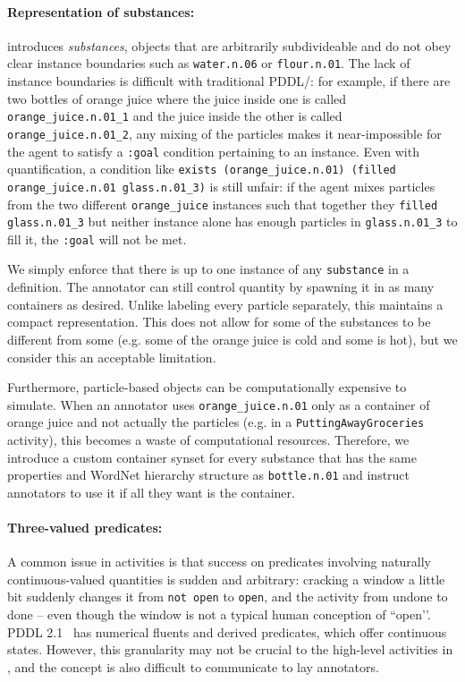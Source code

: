 \paragraph{Representation of substances:} \benchmark introduces \textit{substances}, objects that are arbitrarily subdivideable and do not obey clear instance boundaries such as \texttt{water.n.06} or \texttt{flour.n.01}. The lack of instance boundaries is difficult with traditional PDDL/\bddl: for example, if there are two bottles of orange juice where the juice inside one is called \texttt{orange\_juice.n.01\_1} and the juice inside the other is called \texttt{orange\_juice.n.01\_2}, any mixing of the particles makes it near-impossible for the agent to satisfy a \texttt{:goal} condition pertaining to an instance. Even with quantification, a condition like \texttt{exists (orange\_juice.n.01) (filled orange\_juice.n.01 glass.n.01\_3)} is still unfair: if the agent mixes particles from the two different \texttt{orange\_juice} instances such that together they \texttt{filled glass.n.01\_3} but neither instance alone has enough particles in \texttt{glass.n.01\_3} to fill it, the \texttt{:goal} will not be met.

We simply enforce that there is up to one instance of any \texttt{substance} in a definition. The annotator can still control quantity by spawning it in as many containers as desired. Unlike labeling every particle separately, this maintains a compact representation. This does not allow for some of the substances to be different from some (e.g. some of the orange juice is cold and some is hot), but we consider this an acceptable limitation.

Furthermore, particle-based objects can be computationally expensive to simulate. When an annotator uses \texttt{orange\_juice.n.01} only as a container of orange juice and not actually the particles (e.g. in a \texttt{PuttingAwayGroceries} activity), this becomes a waste of computational resources. Therefore, we introduce a custom container synset for every substance that has the same properties and WordNet hierarchy structure as \texttt{bottle.n.01} and instruct annotators to use it if all they want is the container.

\paragraph{Three-valued predicates:} A common issue in \oldbenchmark activities is that success on predicates involving naturally continuous-valued quantities is sudden and arbitrary: cracking a window a little bit suddenly changes it from \texttt{not open} to \texttt{open}, and the activity from undone to done – even though the window is not a typical human conception of ``open’’. PDDL 2.1~\cite{fox2003pddl21} has numerical fluents and derived predicates, which offer continuous states. However, this granularity may not be crucial to the high-level activities in \benchmark, and the concept is also difficult to communicate to lay annotators.

